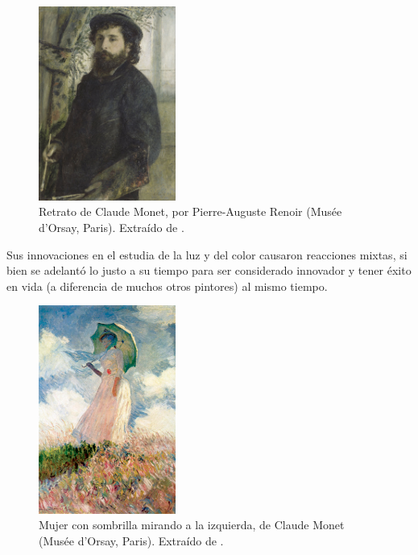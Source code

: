 \documentclass[../main.tex]{subfiles}
\begin{document}
\begin{figure}[h!]
    \centering
    \includegraphics[width=0.4\textwidth]{imagenes/Retrato de Claude Monet.jpg}
    \caption[Retrato de Claude Monet, por Pierre-Auguste Renoir.]{Retrato de Claude Monet, por Pierre-Auguste Renoir (Musée d'Orsay, Paris). Extraído de \cite{Renoir1875}.}
    \label{fig:monet_retrato}
\end{figure}

Sus innovaciones en el estudia de la luz y del color causaron reacciones mixtas, si bien se adelantó lo justo a su tiempo para ser considerado innovador y tener éxito en vida (a diferencia de muchos otros pintores) al mismo tiempo. \newline

\begin{figure}[h!]
    \centering
    \includegraphics[width=0.4\textwidth]{imagenes/Mujer con sombrilla mirando a la izquierda.jpg}
    \caption[Mujer con sombrilla mirando a la izquierda, de Claude Monet]{Mujer con sombrilla mirando a la izquierda, de Claude Monet (Musée d'Orsay, Paris). Extraído de \cite{Monet1886}.}
    \label{fig:monet_mujer}
\end{figure}
\end{document}
